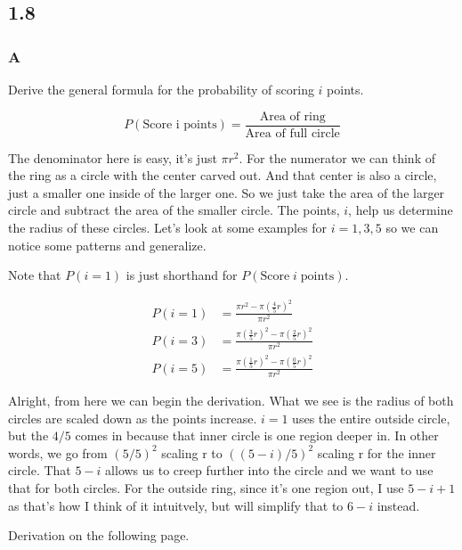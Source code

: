 \subsection*{1.8}


\subsubsection*{A}

Derive the general formula for the probability of scoring $i$ points.

\[
	P(\text{Score i points}) = \frac{\text{Area of ring}}{\text{Area of full circle}}
\]

The denominator here is easy, it's just $\pi r^2$. For the numerator we can think of the ring as a circle with the center carved out. And that center is also a circle, just a smaller one inside of the larger one. So we just take the area of the larger circle and subtract the area of the smaller circle. The points, $i$, help us determine the radius of these circles. Let's look at some examples for $i=1,3,5$ so we can notice some patterns and generalize.

Note that $P(i=1)$ is just shorthand for $P(\text{Score}\; i\; \text{points})$. 

\begin{align*}
	P(i=1) &= \frac{\pi r^2 - \pi(\frac{4}{5} r)^2}{\pi r^2} \\
	P(i=3) &= \frac{\pi(\frac{3}{5} r)^2 - \pi(\frac{2}{5} r)^2}{\pi r^2} \\
	P(i=5) &= \frac{\pi(\frac{1}{5} r)^2 - \pi(\frac{0}{5} r)^2}{\pi r^2}
\end{align*}

Alright, from here we can begin the derivation. What we see is the radius of both circles are scaled down as the points increase. $i=1$ uses the entire outside circle, but the $4/5$ comes in because that inner circle is one region deeper in. In other words, we go from $(5/5)^2$ scaling r to $((5-i)/5)^2$ scaling r for the inner circle. That $5-i$ allows us to creep further into the circle and we want to use that for both circles. For the outside ring, since it's one region out, I use $5 - i + 1$ as that's how I think of it intuitvely, but will simplify that to $6-i$ instead.

Derivation on the following page.

